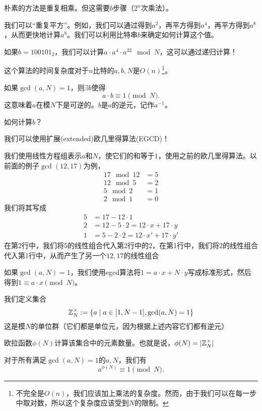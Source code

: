 朴素的方法是重复相乘。但这需要$b$步骤（$2^n$次乘法）。

我们可以“重复平方”。例如，我们可以通过得到$a^2$，再平方得到$a^4$，再平方得到$a^8$，从而更快地计算$a^8$。我们可以利用比特串$b$来确定如何计算这个值。

\begin{example*}
    如果$b = 100101_2$，我们可以计算$a\cdot a^4\cdot a^{32}\mod N$，这可以通过递归计算！
\end{example*}

这个算法的时间复杂度对于$n$比特的$a, b, N$是$O(n)$\footnote{不完全是$O(n)$，我们应该加上乘法的复杂度。然而，由于我们可以在每一步中取对数，所以这个复杂度应该受到$N$的限制。}。

\begin{theorem}
    如果$\gcd(a,N) = 1$，则$\exists b$使得
    \[a\cdot b \equiv 1\pmod{N}.\]
	这意味着$a$在模$N$下是可逆的。$b$是$a$的逆元，记作$a^{-1}$。
\end{theorem}

\begin{ques*}
    如何计算$b$？
\end{ques*}
我们可以使用扩展(extended)欧几里得算法(EGCD)！
\begin{example*}
    我们使用线性方程组表示$a$和$N$，使它们的和等于$1$，使用之前的欧几里得算法。以前面的例子$\gcd(12, 17)$为例，
    \begin{align*}
        17\mod{12} & = 5 \\
        12 \mod{5} & = 2 \\
        5\mod{2}   & = 1 \\
        2\mod{1}   & = 0
    \end{align*}
    我们将其写成
    \begin{align*}
        5 & = 17 - 12\cdot 1                         \\
        2 & = 12 - 5\cdot 2 = 12\cdot x + 17\cdot y  \\
        1 & = 5 - 2\cdot 2 = 12\cdot x' + 17\cdot y'
    \end{align*}
    在第2行中，我们将$5$的线性组合代入第2行中的$2$，在第1行中，我们将$2$的线性组合代入第1行中，从而产生了另一个$12, 17$的线性组合

    如果$\gcd(a, N) = 1$，我们使用egcd算法将$1 = a\cdot x + N\cdot y$写成标准形式，然后得到$1\equiv a\cdot x\pmod{N}$。
\end{example*}

\begin{definition}[模$N$的单位群]
    我们定义集合
    \[\mathbb Z_N^\times:= \left\{ a\mid a\in [1, N-1], \gcd(a, N) = 1 \right\}\]
    这是模$N$的单位群（它们都是单位元，因为根据上述内容它们都有逆元）
\end{definition}
\begin{definition}[欧拉函数]
    欧拉函数$\phi(N)$计算该集合中的元素数量。也就是说，$\phi(N) = |\mathbb Z_N^\times|$
\end{definition}
\begin{theorem}[欧拉定理]
	对于所有满足$\gcd(a, N) = 1$的$a, N$，我们有\[a^{\phi(N)} \equiv 1\pmod{N}.\]
\end{theorem}

